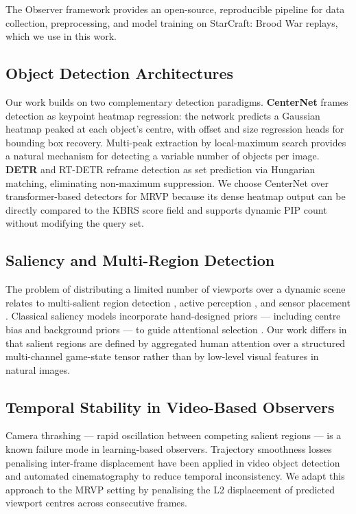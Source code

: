 \documentclass[preprint,12pt]{elsarticle}
\begin{document}
The Observer framework \cite{bae2025observer} provides an open-source, 
reproducible pipeline for data collection, preprocessing, and model training 
on StarCraft: Brood War replays, which we use in this work.

\subsection{Object Detection Architectures}

Our work builds on two complementary detection paradigms. 
\textbf{CenterNet} \cite{zhou2019objects} frames detection as keypoint 
heatmap regression: the network predicts a Gaussian heatmap peaked at each 
object's centre, with offset and size regression heads for bounding box 
recovery. Multi-peak extraction by local-maximum search provides a natural 
mechanism for detecting a variable number of objects per image. 
\textbf{DETR} \cite{carion2020end} and RT-DETR \cite{lv2023detrs} reframe 
detection as set prediction via Hungarian matching, eliminating 
non-maximum suppression. We choose CenterNet over transformer-based detectors 
for MRVP because its dense heatmap output can be directly compared to the KBRS 
score field and supports dynamic PIP count without modifying the query set.

\subsection{Saliency and Multi-Region Detection}

The problem of distributing a limited number of viewports over a dynamic scene 
relates to multi-salient region detection \cite{shi2016hierarchical}, active 
perception \cite{chen2011active}, and sensor placement 
\cite{krause2008near}. Classical saliency models incorporate hand-designed 
priors — including centre bias and background priors — to guide attentional 
selection \cite{itti1998model, wei2012geodesic, tatler2007central}. Our work 
differs in that salient regions are defined by aggregated human attention over 
a structured multi-channel game-state tensor rather than by low-level visual 
features in natural images.

\subsection{Temporal Stability in Video-Based Observers}

Camera thrashing — rapid oscillation between competing salient regions — is a 
known failure mode in learning-based observers. Trajectory smoothness losses 
penalising inter-frame displacement have been applied in video object detection 
\cite{feichtenhofer2017detect} and automated cinematography 
\cite{gandhi2014video} to reduce temporal inconsistency. We adapt this 
approach to the MRVP setting by penalising the L2 displacement of predicted 
viewport centres across consecutive frames.
\end{document}
